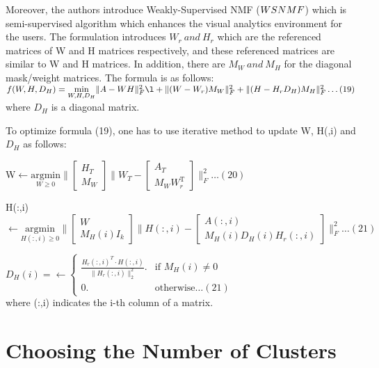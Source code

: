 \documentclass[11pt, oneside]{article}   	%
\begin{document}
\begin{Large}
Moreover, the authors introduce Weakly-Supervised NMF ($WS\-NMF$) which is semi-supervised algorithm which enhances the visual analytics environment for the users.  The formulation introduces $W_{r} \ and \ H_{r}$ which are the referenced matrices of W and H matrices respectively, and these referenced matrices are similar to W and H matrices.  In addition, there are $M_W\ and \ M_{H}$ for the diagonal mask/weight matrices.  The formula is as follows:\\
$f(W,H,D_H)=\underset{W,H,D_H}{\mathrm{min}}\|A-WH\|^{\mathrm{2}}_{F} \l+\|(W-W_r)M_W\|^{\mathrm{2}}_{F} +\|(H-H_rD_H)M_H\|^{\mathrm{2}}_{F}\ldots (19)$ where $D_H$ is a diagonal matrix.

To optimize formula (19), one has to use iterative method to update W, H(,i) and $D_H$ as follows:

W$\leftarrow \underset{W\geq0}{\mathrm{argmin}}\|[{\begin{array}{c}
H_T\\
M_W    
\end{array}}]\|W_T-[{\begin{array}{c}
A_T\\
M_WW^{\mathrm{T}}_{r}    
\end{array}}]\|^{\mathrm{2}}_{F}\ldots (20)$

H(:,i)$\leftarrow \underset{H(:,i)\geq0}{\mathrm{argmin}}\|[{\begin{array}{c}
W\\
M_{H}(i)I_{k}    
\end{array}}]\|H(:,i)-[{\begin{array}{c}
A(:,i)\\
M_{H}(i)D_{H}(i)H_{r}(:,i)    
\end{array}}]\|^{\mathrm{2}}_{F}\ldots (21)$

$D_{H}(i)=\leftarrow\begin{cases} \frac{H_{r}(:,i)^T \cdot H(:,i)}{\|H_{r}(:,i)\|^{\mathrm{2}}_{2}}.    &\text{if \(M_{H}(i)\neq0\)}\\ 0. &\text{otherwise}\ldots (21)\end{cases}$\\
where (:,i) indicates the i-th column of a matrix.

\section{Choosing the Number of Clusters}


\end{Large}
\end{document}
